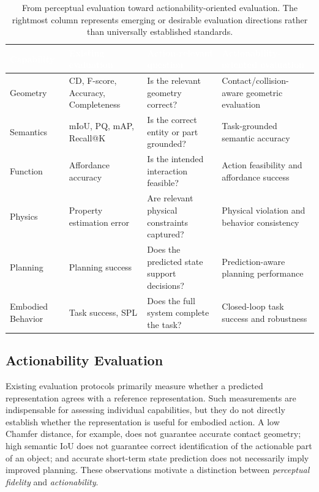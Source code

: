\documentclass{SCIS2026}
\renewcommand{\arraystretch}{1.45}
\begin{document}
\begin{table}[!t]
\centering
\caption{From perceptual evaluation toward actionability-oriented evaluation. The rightmost column represents emerging or desirable evaluation directions rather than universally established standards.}
\label{tab:actionability_evaluation}
\footnotesize
\setlength{\tabcolsep}{5pt}
\renewcommand{\arraystretch}{1.35}
\begin{tabularx}{\textwidth}{>{\RaggedRight\arraybackslash}p{2.3cm} >{\RaggedRight\arraybackslash}X >{\RaggedRight\arraybackslash}X >{\RaggedRight\arraybackslash}X}
\toprule
\rowcolor{TableNavy}
\textcolor{white}{\bfseries Capability}
& \textcolor{white}{\bfseries Existing evaluation}
& \textcolor{white}{\bfseries Action-relevant question}
& \textcolor{white}{\bfseries Actionability-oriented evaluation} \\
\midrule
\rowcolor{TableSub}
Geometry & CD, F-score, Accuracy, Completeness &
Is the relevant geometry correct? &
Contact/collision-aware geometric evaluation \\
Semantics & mIoU, PQ, mAP, Recall@K &
Is the correct entity or part grounded? &
Task-grounded semantic accuracy \\
\rowcolor{TableSub}
Function & Affordance accuracy &
Is the intended interaction feasible? &
Action feasibility and affordance success \\
Physics & Property estimation error &
Are relevant physical constraints captured? &
Physical violation and behavior consistency \\
\rowcolor{TableSub}
Planning & Planning success &
Does the predicted state support decisions? &
Prediction-aware planning performance \\
Embodied Behavior & Task success, SPL &
Does the full system complete the task? &
Closed-loop task success and robustness \\
\bottomrule
\end{tabularx}
\end{table}
\subsection{Actionability Evaluation}
Existing evaluation protocols primarily measure whether a predicted representation agrees with a reference representation. Such measurements are indispensable for assessing individual capabilities, but they do not directly establish whether the representation is useful for embodied action. A low Chamfer distance, for example, does not guarantee accurate contact geometry; high semantic IoU does not guarantee correct identification of the actionable part of an object; and accurate short-term state prediction does not necessarily imply improved planning. These observations motivate a distinction between \emph{perceptual fidelity} and \emph{actionability}.
\end{document}
